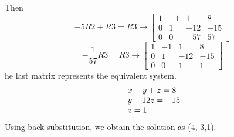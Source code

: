 \documentclass{book}
\begin{document}
Then
\begin{equation*}
	-5R2 + R3 = R3 \rightarrow
	\begin{bmatrix}
	1 & -1 & 1 & 8\\
	0 & 1 & -12 & -15\\
	0 & 0 & -57 & 57
	\end{bmatrix}
\end{equation*}
\begin{equation*}
	-\frac{1}{57}R3 = R3 \rightarrow
	\begin{bmatrix}
	1 & -1 & 1 & 8\\
	0 & 1 & -12 & -15\\
	0 & 0 & 1 & 1
	\end{bmatrix}
\end{equation*}
he last matrix represents the equivalent system.
\begin{equation*}
\begin{array}{l}\text{ }x-y+z=8\hfill \\ \text{ }y - 12z=-15\hfill \\ \text{ }z=1\hfill \end{array}
\end{equation*}
Using back-substitution, we obtain the solution as (4,-3,1).
\end{document}
